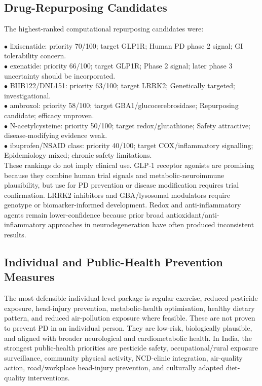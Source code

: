 \documentclass{article}
\begin{document}
\subsection{Drug-Repurposing Candidates}

The highest-ranked computational repurposing candidates were:


\noindent $\bullet$ lixisenatide: priority 70/100; target GLP1R; Human PD phase 2 signal; GI tolerability concern.\\
\noindent $\bullet$ exenatide: priority 66/100; target GLP1R; Phase 2 signal; later phase 3 uncertainty should be incorporated.\\
\noindent $\bullet$ BIIB122/DNL151: priority 63/100; target LRRK2; Genetically targeted; investigational.\\
\noindent $\bullet$ ambroxol: priority 58/100; target GBA1/glucocerebrosidase; Repurposing candidate; efficacy unproven.\\
\noindent $\bullet$ N-acetylcysteine: priority 50/100; target redox/glutathione; Safety attractive; disease-modifying evidence weak.\\
\noindent $\bullet$ ibuprofen/NSAID class: priority 40/100; target COX/inflammatory signalling; Epidemiology mixed; chronic safety limitations.\\

These rankings do not imply clinical use. GLP-1 receptor agonists are promising because they combine human trial signals and metabolic-neuroimmune plausibility, but use for PD prevention or disease modification requires trial confirmation. LRRK2 inhibitors and GBA/lysosomal modulators require genotype or biomarker-informed development. Redox and anti-inflammatory agents remain lower-confidence because prior broad antioxidant/anti-inflammatory approaches in neurodegeneration have often produced inconsistent results.


\subsection{Individual and Public-Health Prevention Measures}

The most defensible individual-level package is regular exercise, reduced pesticide exposure, head-injury prevention, metabolic-health optimisation, healthy dietary pattern, and reduced air-pollution exposure where feasible. These are not proven to prevent PD in an individual person. They are low-risk, biologically plausible, and aligned with broader neurological and cardiometabolic health. In India, the strongest public-health priorities are pesticide safety, occupational/rural exposure surveillance, community physical activity, NCD-clinic integration, air-quality action, road/workplace head-injury prevention, and culturally adapted diet-quality interventions.
\end{document}
